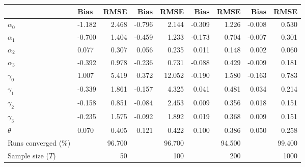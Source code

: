 
\begin{tabular}[t]{llrrrrrrr}
\toprule
  & Bias & RMSE & Bias & RMSE & Bias & RMSE & Bias & RMSE\\
\midrule
$\alpha_{0}$ & -1.182 & 2.468 & -0.796 & 2.144 & -0.309 & 1.226 & -0.008 & 0.530\\
$\alpha_{1}$ & -0.700 & 1.404 & -0.459 & 1.233 & -0.173 & 0.704 & -0.007 & 0.301\\
$\alpha_{2}$ & 0.077 & 0.307 & 0.056 & 0.235 & 0.011 & 0.148 & 0.002 & 0.060\\
$\alpha_{3}$ & -0.392 & 0.978 & -0.236 & 0.731 & -0.088 & 0.429 & -0.009 & 0.181\\
$\gamma_{0}$ & 1.007 & 5.419 & 0.372 & 12.052 & -0.190 & 1.580 & -0.163 & 0.783\\
$\gamma_{1}$ & -0.339 & 1.861 & -0.157 & 4.325 & 0.041 & 0.481 & 0.034 & 0.214\\
$\gamma_{2}$ & -0.158 & 0.851 & -0.084 & 2.453 & 0.009 & 0.356 & 0.018 & 0.151\\
$\gamma_{3}$ & -0.235 & 1.575 & -0.092 & 1.892 & 0.019 & 0.368 & 0.009 & 0.151\\
$\theta$ & 0.070 & 0.405 & 0.121 & 0.422 & 0.100 & 0.386 & 0.050 & 0.258\\
Runs converged (\%) &  & 96.700 &  & 96.700 &  & 94.500 &  & 99.400\\
Sample size ($T$) &  & 50 &  & 100 &  & 200 &  & 1000\\
\bottomrule
\end{tabular}
